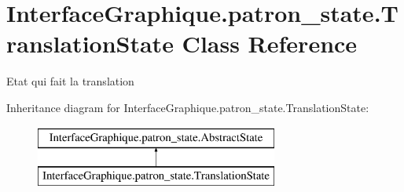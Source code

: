 \hypertarget{class_interface_graphique_1_1patron__state_1_1_translation_state}{\section{Interface\-Graphique.\-patron\-\_\-state.\-Translation\-State Class Reference}
\label{class_interface_graphique_1_1patron__state_1_1_translation_state}
}


Etat qui fait la translation  


Inheritance diagram for Interface\-Graphique.\-patron\-\_\-state.\-Translation\-State\-:\begin{figure}[H]
\begin{center}
\leavevmode
\includegraphics[height=2.000000cm]{class_interface_graphique_1_1patron__state_1_1_translation_state}
\end{center}
\end{figure}

